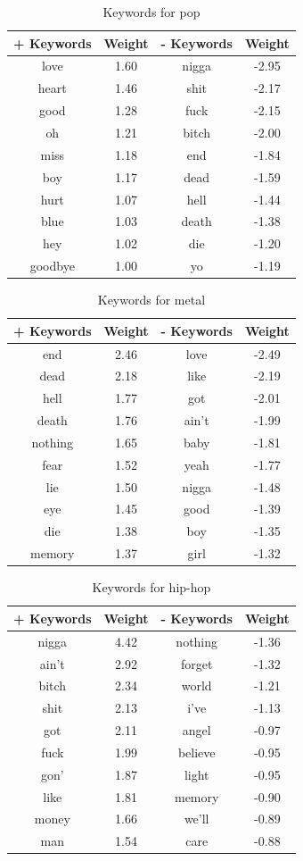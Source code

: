 \documentclass[a4paper,11pt]{article}
\begin{document}
\begin{table}[h!]
\centering
\label{baseline}
\begin{tabular}{cccc}
\hline
+ Keywords & Weight & - Keywords & Weight \\
\hline
love & 1.60 & nigga & -2.95 \\
heart & 1.46 & shit & -2.17 \\
good & 1.28 & fuck & -2.15 \\
oh & 1.21 & bitch & -2.00 \\
miss & 1.18 & end & -1.84 \\
boy & 1.17 & dead & -1.59 \\
hurt & 1.07 & hell & -1.44 \\
blue & 1.03 & death & -1.38 \\
hey & 1.02 & die & -1.20 \\
goodbye & 1.00 & yo & -1.19 \\
\end{tabular}
\caption{Keywords for pop}
\end{table}

\begin{table}[h!]
\centering
\label{baseline}
\begin{tabular}{cccc}
\hline
+ Keywords & Weight & - Keywords & Weight \\
\hline
end & 2.46 & love & -2.49 \\
dead & 2.18 & like & -2.19 \\
hell & 1.77 & got & -2.01 \\
death & 1.76 & ain't & -1.99 \\
nothing & 1.65 & baby & -1.81 \\
fear & 1.52 & yeah & -1.77 \\
lie & 1.50 & nigga & -1.48 \\
eye & 1.45 & good & -1.39 \\
die & 1.38 & boy & -1.35 \\
memory & 1.37 & girl & -1.32 \\
\end{tabular}
\caption{Keywords for metal}
\end{table}

\begin{table}[h!]
\centering
\label{baseline}
\begin{tabular}{cccc}
\hline
+ Keywords & Weight & - Keywords & Weight \\
\hline
nigga & 4.42 & nothing & -1.36 \\
ain't & 2.92 & forget & -1.32 \\
bitch & 2.34 & world & -1.21 \\
shit & 2.13 & i've & -1.13 \\
got & 2.11 & angel & -0.97 \\
fuck & 1.99 & believe & -0.95 \\
gon' & 1.87 & light & -0.95 \\
like & 1.81 & memory & -0.90 \\
money & 1.66 & we'll & -0.89 \\
man & 1.54 & care & -0.88 \\
\end{tabular}
\caption{Keywords for hip-hop}
\end{table}
\end{document}
